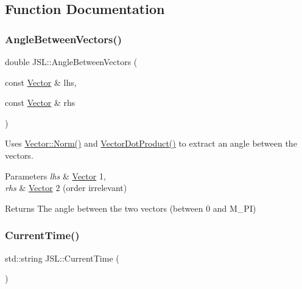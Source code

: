\subsection{Function Documentation}
\mbox{\label{namespaceJSL_a09355c91f84fd99d4634bf9189fef51d}} 
\subsubsection{\texorpdfstring{Angle\+Between\+Vectors()}{AngleBetweenVectors()}}
{\footnotesize\ttfamily double J\+S\+L\+::\+Angle\+Between\+Vectors (\begin{DoxyParamCaption}\item[{const \hyperlink{classJSL_1_1Vector}{Vector} \&}]{lhs,  }\item[{const \hyperlink{classJSL_1_1Vector}{Vector} \&}]{rhs }\end{DoxyParamCaption})\hspace{0.3cm}{\ttfamily [inline]}}



Uses \hyperlink{classJSL_1_1Vector_aa8af717591f5548ff471b6e4b28d7f9c}{Vector\+::\+Norm()} and \hyperlink{namespaceJSL_aeae64b7e0cfdc1ab5f35cca90c32d9f6}{Vector\+Dot\+Product()} to extract an angle between the vectors. 


\begin{DoxyParams}{Parameters}
{\em lhs} & \hyperlink{classJSL_1_1Vector}{Vector} 1, \\
\hline
{\em rhs} & \hyperlink{classJSL_1_1Vector}{Vector} 2 (order irrelevant) \\
\hline
\end{DoxyParams}
\begin{DoxyReturn}{Returns}
The angle between the two vectors (between 0 and M\+\_\+\+PI) 
\end{DoxyReturn}
\mbox{\label{namespaceJSL_ae58b7096986a16b70a27e1609eff3014}} 
\subsubsection{\texorpdfstring{Current\+Time()}{CurrentTime()}}
{\footnotesize\ttfamily std\+::string J\+S\+L\+::\+Current\+Time (\begin{DoxyParamCaption}{ }\end{DoxyParamCaption})\hspace{0.3cm}{\ttfamily [inline]}}


